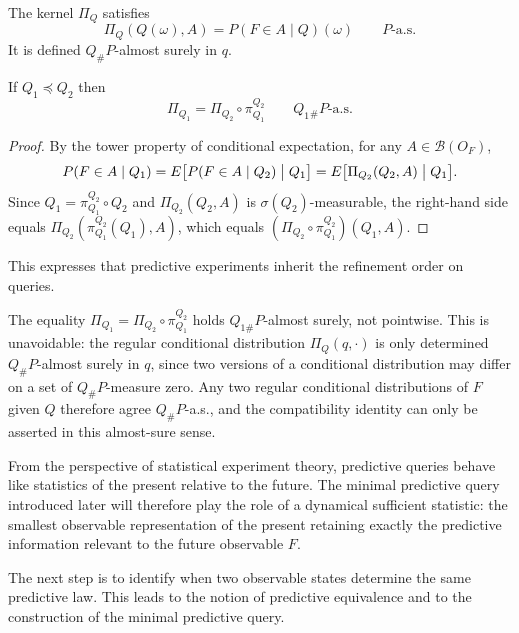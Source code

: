 \begin{remark}
The kernel $\Pi_Q$ satisfies
\[
\Pi_Q(Q(\omega),A)
=
P(F\in A\mid Q)(\omega)
\qquad \text{$P$-a.s.}
\]
It is defined $Q_\#P$-almost surely in $q$.
\end{remark}

\begin{proposition}\label{prop:pred-compat}
If $Q_1\preceq Q_2$ then
\[
\Pi_{Q_1}
=
\Pi_{Q_2}\circ\pi^{Q_2}_{Q_1}
\qquad Q_1{}_\#P\text{-a.s.}
\]
\end{proposition}

\begin{proof}
By the tower property of conditional expectation,
for any $A\in\mathcal B(O_F)$,
\[
P(F\in A\mid Q_1)
=
E\bigl[P(F\in A\mid Q_2)\bigm| Q_1\bigr]
=
E\bigl[\Pi_{Q_2}(Q_2,A)\bigm| Q_1\bigr].
\]
Since $Q_1=\pi^{Q_2}_{Q_1}\circ Q_2$ and $\Pi_{Q_2}(Q_2,A)$ is
$\sigma(Q_2)$-measurable, the right-hand side equals
$\Pi_{Q_2}(\pi^{Q_2}_{Q_1}(Q_1),A)$,
which equals $(\Pi_{Q_2}\circ\pi^{Q_2}_{Q_1})(Q_1,A)$.
\end{proof}

This expresses that predictive experiments inherit the refinement order on queries.

\begin{remark}
The equality $\Pi_{Q_1} = \Pi_{Q_2}\circ\pi^{Q_2}_{Q_1}$ holds
$Q_{1\#}P$-almost surely, not pointwise.  This is unavoidable:
the regular conditional distribution $\Pi_Q(q,\cdot)$ is only
determined $Q_\#P$-almost surely in $q$, since two versions of a
conditional distribution may differ on a set of $Q_\#P$-measure
zero.  Any two regular conditional distributions of $F$ given $Q$
therefore agree $Q_\#P$-a.s., and the compatibility identity can
only be asserted in this almost-sure sense.
\end{remark}

\bigskip

\begin{remark}
From the perspective of statistical experiment theory, predictive
queries behave like statistics of the present relative to the future.
The minimal predictive query introduced later will therefore play the
role of a dynamical sufficient statistic: the smallest observable
representation of the present retaining exactly the predictive
information relevant to the future observable $F$.
\end{remark}

The next step is to identify when two observable states determine the
same predictive law.  This leads to the notion of predictive
equivalence and to the construction of the minimal predictive query.

